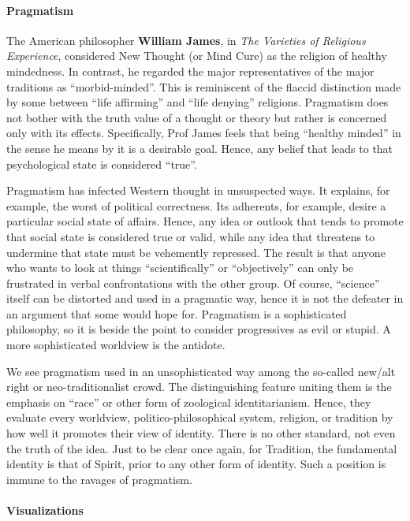 \paragraph{Pragmatism}


The American philosopher \textbf{William James}, in \emph{The Varieties of Religious Experience}, considered New Thought (or Mind Cure) as the religion of healthy mindedness. In contrast, he regarded the major representatives of the major traditions as ``morbid-minded''. This is reminiscent of the flaccid distinction made by some between ``life affirming'' and ``life denying'' religions. Pragmatism does not bother with the truth value of a thought or theory but rather is concerned only with its effects. Specifically, Prof James feels that being ``healthy minded'' in the sense he means by it is a desirable goal. Hence, any belief that leads to that psychological state is considered ``true''.

Pragmatism has infected Western thought in unsuspected ways. It explains, for example, the worst of political correctness. Its adherents, for example, desire a particular social state of affairs. Hence, any idea or outlook that tends to promote that social state is considered true or valid, while any idea that threatens to undermine that state must be vehemently repressed. The result is that anyone who wants to look at things ``scientifically'' or ``objectively'' can only be frustrated in verbal confrontations with the other group. Of course, ``science'' itself can be distorted and used in a pragmatic way, hence it is not the defeater in an argument that some would hope for. Pragmatism is a sophisticated philosophy, so it is beside the point to consider progressives as evil or stupid. A more sophisticated worldview is the antidote.

We see pragmatism used in an unsophisticated way among the so-called new/alt right or neo-traditionalist crowd. The distinguishing feature uniting them is the emphasis on ``race'' or other form of zoological identitarianism. Hence, they evaluate every worldview, politico-philosophical system, religion, or tradition by how well it promotes their view of identity. There is no other standard, not even the truth of the idea. Just to be clear once again, for Tradition, the fundamental identity is that of Spirit, prior to any other form of identity. Such a position is immune to the ravages of pragmatism.

\paragraph{Visualizations}



